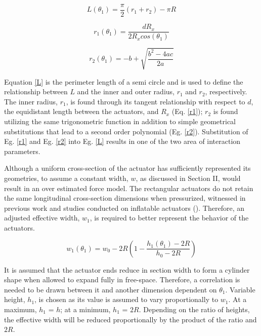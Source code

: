 

\begin{equation}\label{L}
	L(\theta_1)  = \frac{\pi}{2}(r_1+r_2) -\pi R
\end{equation}

\begin{equation}\label{r1}
	r_1(\theta_1)  = \frac{dR_x}{2R_xcos(\theta_1)}
\end{equation}
 
 \begin{equation}\label{r2}
	r_2(\theta_1)  = -b + \sqrt{\frac{b^2-4ac}{2a}}
\end{equation}

Equation \ref{L} is the perimeter length of a semi circle and is used to define the relationship between $L$ and the inner and outer radius, $r_1$ and $r_2$, respectively. The inner radius, $r_1$, is found through its tangent relationship with respect to $d$, the equidistant length between the actuators, and $R_x$ (Eq. \ref{r1}); $r_2$ is found utilizing the same trigonometric function in addition to simple geometrical substitutions that lead to a second order polynomial (Eg. \ref{r2}). Substitution of Eg. \ref{r1} and Eg. \ref{r2} into Eg. \ref{L} results in one of the two area of interaction parameters. 

Although a uniform cross-section of the actuator has sufficiently represented its geometries, to assume a constant width, $w$, as discussed in Section II, would result in an over estimated force model. The rectangular actuators do not retain the same longitudinal cross-section dimensions when pressurized, witnessed in previous work and studies conducted on inflatable actuators (\cite{Natividad2017}). Therefore, an adjusted effective width, $w_1$, is required to better represent the behavior of the actuators. 

\begin{equation}\label{w1}
	w_1(\theta_1)  = w_0-2R(1-\frac{h_1(\theta_1)-2R}{h_0-2R})
\end{equation}


It is assumed that the actuator ends reduce in section width to form a cylinder shape when allowed to expand fully in free-space. Therefore, a correlation is needed to be drawn between it and another dimension dependent on $\theta_1$. Variable height, $h_1$, is chosen as its value is assumed to vary proportionally to $w_1$. At a maximum, $h_1$ =  $h$; at a minimum, $h_1$ = $2R$. Depending on the ratio of heights, the effective width will be reduced proportionally by the product of the ratio and $2R$. 

